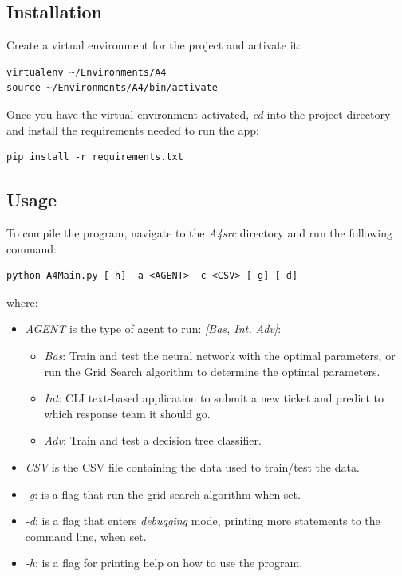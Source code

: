 \documentclass[letterpaper,12pt]{article}
\begin{document}
\subsection{Installation}

Create a virtual environment for the project and activate it:

\begin{lstlisting}
virtualenv ~/Environments/A4
source ~/Environments/A4/bin/activate
\end{lstlisting}

Once you have the virtual environment activated, \textit{cd} into the project directory and install the requirements needed to run the app:

\begin{lstlisting}
pip install -r requirements.txt
\end{lstlisting}

\subsection{Usage}

To compile the program, navigate to the \textit{A4src} directory and run the following command:

\begin{lstlisting}
python A4Main.py [-h] -a <AGENT> -c <CSV> [-g] [-d]
\end{lstlisting}

where:

\begin{itemize}
    \item \textit{AGENT} is the type of agent to run: \textit{[Bas, Int, Adv]}:
    \begin{itemize}
        \item \textit{Bas}: Train and test the neural network with the optimal parameters, or run the Grid Search algorithm to determine the optimal parameters.
        \item \textit{Int}: CLI text-based application to submit a new ticket and predict to which response team it should go.
        \item \textit{Adv}: Train and test a decision tree classifier.
    \end{itemize}
    \item \textit{CSV} is the CSV file containing the data used to train/test the data.
    \item \textit{-g}: is a flag that run the grid search algorithm when set.
    \item \textit{-d}: is a flag that enters \textit{debugging} mode, printing more statements to the command line, when set.
    \item \textit{-h}: is a flag for printing help on how to use the program.
\end{itemize}
\end{document}
